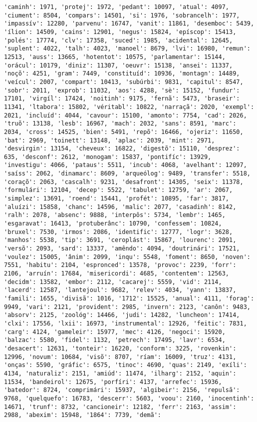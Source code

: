 \documentclass[11pt]{article}
\begin{document}
\begin{Verbatim}[commandchars=\\\{\}]
'caminh': 1971, 'protej': 1972, 'pedant': 10097, 'atual': 4097, 'ciument': 8504, 'compars': 14501, 'si': 1976, 'sobrancelh': 1977, 'impassív': 12280, 'parvenu': 16747, 'vanit': 11861, 'desemboc': 5439, 'ílion': 14509, 'cains': 12901, 'negus': 15824, 'epíscop': 15413, 'polés': 17774, 'clv': 17358, 'suced': 1985, 'acidental': 12645, 'suplent': 4022, 'talh': 4023, 'manoel': 8679, 'lvi': 16980, 'remun': 12513, 'auss': 13665, 'hotentot': 10575, 'parlamentar': 15144, 'orácul': 10179, 'diniz': 11307, 'oeuvr': 15138, 'ansei': 11337, 'noçõ': 4251, 'gram': 7449, 'constituíd': 10936, 'montagn': 14489, 'veícul': 2007, 'compart': 10413, 'subúrbi': 9831, 'capitul': 8547, 'sobr': 2011, 'exprob': 11032, 'aos': 4288, 'sè': 15152, 'fundur': 17101, 'virgíl': 17424, 'noitinh': 9175, 'fernã': 5473, 'braseir': 11341, 'ltabora': 15802, 'véritabl': 10822, 'narraçã': 2020, 'exempl': 2021, 'incluíd': 4044, 'cavour': 15100, 'amonto': 7754, 'cad': 2026, 'truõ': 13138, 'lesb': 16967, 'mach': 2032, 'sans': 8591, 'marc': 2034, 'cross': 14525, 'bien': 5491, 'repõ': 16466, 'ojeriz': 11650, 'bat': 2969, 'toinett': 13148, 'aplac': 2039, 'mint': 2971, 'desvirgin': 13154, 'cheveux': 16822, 'digestõ': 15110, 'desprez': 635, 'desconf': 2612, 'monogam': 15837, 'pontifíc': 13929, 'investigu': 4066, 'pataus': 5511, 'incub': 4068, 'avelhant': 12097, 'saíss': 2062, 'dinamarc': 8609, 'arqueólog': 9489, 'transfer': 5518, 'coraçõ': 2063, 'cascalh': 9231, 'desafront': 14305, 'seix': 11378, 'formulári': 12104, 'decep': 5522, 'tabulet': 12759, 'ar': 2067, 'simplez': 13691, 'roend': 15441, 'profét': 10895, 'far': 3817, 'aluízi': 15858, 'chanc': 14596, 'malic': 2077, 'casadinh': 8142, 'ralh': 2078, 'absenc': 9888, 'interpôs': 5734, 'lembr': 1465, 'esgaravat': 16413, 'protuberânc': 10790, 'confessem': 10824, 'bruxel': 7530, 'irmos': 2086, 'identific': 12777, 'logr': 3628, 'manhos': 5538, 'tip': 3691, 'ceroplást': 15867, 'lourenc': 2091, 'versõ': 2093, 'sard': 13337, 'amêndo': 4094, 'doutrinári': 17521, 'voulez': 15005, 'ânim': 2099, 'inqu': 5548, 'foment': 8650, 'noven': 7551, 'habitu': 2104, 'espronced': 13578, 'provoc': 2239, 'forr': 2106, 'arruín': 17684, 'misericordi': 4685, 'contentem': 12563, 'decidm': 13582, 'embor': 2112, 'cacarej': 5559, 'vid': 2114, 'lacerd': 12587, 'lantejoul': 9682, 'relev': 4034, 'yann': 13837, 'famili': 1655, 'divisã': 1016, '1712': 15525, 'anual': 4111, 'forag': 9949, 'vari': 2121, 'provident': 2985, 'invern': 2123, 'canôn': 9483, 'absorv': 2125, 'zoológ': 14466, 'judi': 14282, 'luncheon': 17414, 'clxi': 17556, 'lxii': 16973, 'instrumental': 12926, 'feitic': 7831, 'carg': 4124, 'gameleir': 15977, 'mec': 4126, 'negoci': 15920, 'balzac': 5580, 'fidel': 1132, 'petrech': 17495, 'lavr': 6534, 'desacert': 12631, 'tonteir': 16220, 'conform': 3225, 'rovenkin': 12996, 'novum': 10684, 'visõ': 8707, 'ríam': 16009, 'truz': 4131, 'onças': 5590, 'gráfic': 6575, 'tinoc': 4690, 'quas': 2149, 'exíli': 4134, 'naturaliz': 2151, 'amiúd': 11474, 'ilharg': 2152, 'aquin': 11534, 'bandeirol': 12675, 'porfíri': 4137, 'arrefec': 15936, 'batedor': 8724, 'comprimári': 15937, 'algibeir': 2156, 'repulsã': 9768, 'quelquefo': 16783, 'descerr': 5603, 'voou': 2160, 'inocentinh': 14671, 'trunf': 8732, 'cancioneir': 12182, 'ferr': 2163, 'assim': 2988, 'abexim': 15948, '1864': 7739, 'demã': 
\end{Verbatim}
\end{document}

